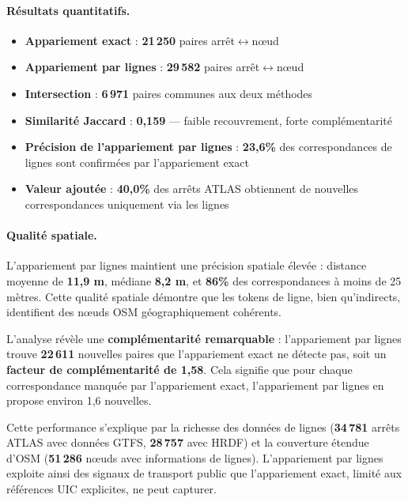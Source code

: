 \paragraph{Résultats quantitatifs.}
\begin{itemize}
  \item \textbf{Appariement exact} : \textbf{21\,250} paires arrêt$\leftrightarrow$nœud
  \item \textbf{Appariement par lignes} : \textbf{29\,582} paires arrêt$\leftrightarrow$nœud
  \item \textbf{Intersection} : \textbf{6\,971} paires communes aux deux méthodes
  \item \textbf{Similarité Jaccard} : \textbf{0,159} — faible recouvrement, forte complémentarité
  \item \textbf{Précision de l'appariement par lignes} : \textbf{23,6\%} des correspondances de lignes sont confirmées par l'appariement exact
  \item \textbf{Valeur ajoutée} : \textbf{40,0\%} des arrêts ATLAS obtiennent de nouvelles correspondances uniquement via les lignes
\end{itemize}

\paragraph{Qualité spatiale.} L'appariement par lignes maintient une précision spatiale élevée : distance moyenne de \textbf{11,9 m}, médiane \textbf{8,2 m}, et \textbf{86\%} des correspondances à moins de 25 mètres. Cette qualité spatiale démontre que les tokens de ligne, bien qu'indirects, identifient des nœuds OSM géographiquement cohérents.

L'analyse révèle une \textbf{complémentarité remarquable} : l'appariement par lignes trouve \textbf{22\,611} nouvelles paires que l'appariement exact ne détecte pas, soit un \textbf{facteur de complémentarité de 1,58}. Cela signifie que pour chaque correspondance manquée par l'appariement exact, l'appariement par lignes en propose environ 1,6 nouvelles.

Cette performance s'explique par la richesse des données de lignes (\textbf{34\,781} arrêts ATLAS avec données GTFS, \textbf{28\,757} avec HRDF) et la couverture étendue d'OSM (\textbf{51\,286} nœuds avec informations de lignes). L'appariement par lignes exploite ainsi des signaux de transport public que l'appariement exact, limité aux références UIC explicites, ne peut capturer.

